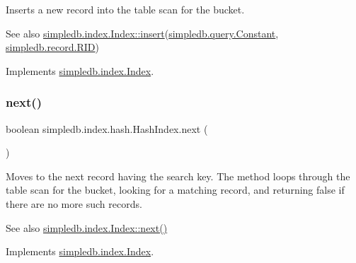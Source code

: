 Inserts a new record into the table scan for the bucket. \begin{DoxySeeAlso}{See also}
\hyperlink{interfacesimpledb_1_1index_1_1Index_a7e72ba9fe47d6d7631e0ad3feee882d7}{simpledb.\+index.\+Index\+::insert}(\hyperlink{classsimpledb_1_1query_1_1Constant}{simpledb.\+query.\+Constant}, \hyperlink{classsimpledb_1_1record_1_1RID}{simpledb.\+record.\+R\+ID}) 
\end{DoxySeeAlso}


Implements \hyperlink{interfacesimpledb_1_1index_1_1Index_a7e72ba9fe47d6d7631e0ad3feee882d7}{simpledb.\+index.\+Index}.

\mbox{\label{classsimpledb_1_1index_1_1hash_1_1HashIndex_a07532e9c86a7d28791f9bed10a27387f}} 
\subsubsection{\texorpdfstring{next()}{next()}}
{\footnotesize\ttfamily boolean simpledb.\+index.\+hash.\+Hash\+Index.\+next (\begin{DoxyParamCaption}{ }\end{DoxyParamCaption})\hspace{0.3cm}{\ttfamily [inline]}}

Moves to the next record having the search key. The method loops through the table scan for the bucket, looking for a matching record, and returning false if there are no more such records. \begin{DoxySeeAlso}{See also}
\hyperlink{interfacesimpledb_1_1index_1_1Index_a38b2addb6813fbf1d94e77de2345724c}{simpledb.\+index.\+Index\+::next()} 
\end{DoxySeeAlso}


Implements \hyperlink{interfacesimpledb_1_1index_1_1Index_a38b2addb6813fbf1d94e77de2345724c}{simpledb.\+index.\+Index}.

\mbox{\label{classsimpledb_1_1index_1_1hash_1_1HashIndex_ae527655fdcef3f63fca081b59dd45b31}} 
